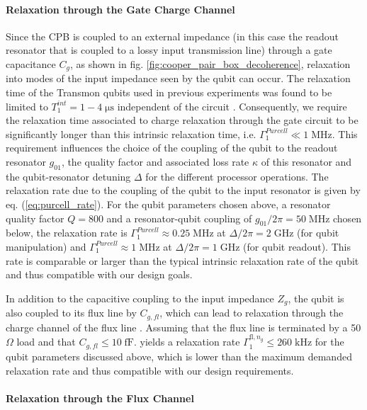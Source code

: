 \paragraph{Relaxation through the Gate Charge Channel}

Since the CPB is coupled to an external impedance (in this case the readout resonator that is coupled to a lossy input transmission line) through a gate capacitance $C_g$, as shown in fig. \ref{fig:cooper_pair_box_decoherence}, relaxation into modes of the input impedance seen by the qubit can occur. The relaxation time of the Transmon qubits used in previous experiments was found to be limited to $T_1^{int}=1-4\;\mathrm{\mu s}$ independent of the circuit \citep{simmonds_decoherence_2004,martinis_decoherence_2005}. Consequently, we require the relaxation time associated to charge relaxation through the gate circuit to be significantly longer than this intrinsic relaxation time, i.e. $\Gamma_1^{Purcell}\ll 1\;\mathrm{MHz}$. This requirement influences the choice of the coupling of the qubit to the readout resonator $g_{01}$, the quality factor and associated loss rate $\kappa$ of this resonator and the qubit-resonator detuning $\Delta$ for the different processor operations. The relaxation rate due to the coupling of the qubit to the input resonator is given by eq. (\ref{eq:purcell_rate}). For the qubit parameters chosen above, a resonator quality factor $Q=800$ and a resonator-qubit coupling of $g_{01}/2\pi=50\;\mathrm{MHz}$ chosen below, the relaxation rate is $\Gamma_1^{Purcell}\approx 0.25\;\mathrm{MHz}$ at $\Delta/2\pi = 2\;\mathrm{GHz}$ (for qubit manipulation) and $\Gamma_1^{Purcell}\approx 1\;\mathrm{MHz}$ at $\Delta/2\pi = 1\;\mathrm{GHz}$ (for qubit readout). This rate is comparable or larger than the typical intrinsic relaxation rate of the qubit and thus compatible with our design goals.

\smallskip

In addition to the capacitive coupling to the input impedance $Z_g$, the qubit is also coupled to its flux line by $C_{g,fl}$, which can lead to relaxation through the charge channel of the flux line \citep{johnson_controlling_2010}. Assuming that the flux line is terminated by a 50 $\Omega$ load and that $C_{g,fl}\le 10\;\mathrm{fF}$. yields a relaxation rate $\Gamma_1^{\mathrm{fl},n_g}\le 260 \;\mathrm{kHz}$ for the qubit parameters discussed above, which is lower than the maximum demanded relaxation rate and thus compatible with our design requirements.
 
\paragraph{Relaxation through the Flux Channel} \label{section:relaxation_through_charge}

